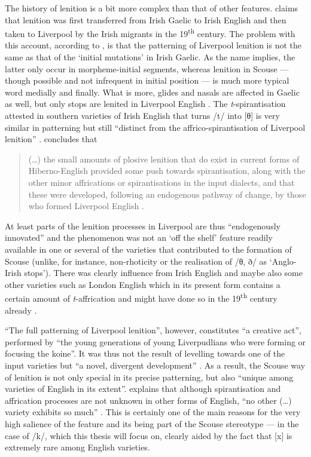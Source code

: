 The history of lenition is a bit more complex than that of other features.
\textcite{hickey1996} claims that lenition was first transferred from Irish Gaelic to Irish English and then taken to Liverpool by the Irish migrants in the 19\textsuperscript{th} century.
The problem with this account, according to \citet{honeybone2007}, is that the patterning of Liverpool lenition is not the same as that of the `initial mutations' in Irish Gaelic.
As the name implies, the latter only occur in morpheme-initial segments, whereas lenition in Scouse --- though possible and not infrequent in initial position --- is much more typical word medially and finally.
What is more, glides and nasals are affected in Gaelic as well, but only stops are lenited in Liverpool English \citep[cf.][131]{honeybone2007}.
The \emph{t}-spirantisation attested in southern varieties of Irish English that turns /t/ into [θ] is very similar in patterning but still ``distinct from the affrico-spirantisation of Liverpool lenition'' \citep[132]{honeybone2007}.
\citeauthor{honeybone2007} concludes that

	\begin{quote}
		(\ldots) the small amounts of plosive lenition that do exist in current forms of Hiberno-English provided some push towards spirantisation, along with the other minor affrications or spirantisations in the input dialects, and that these were developed, following an endogenous pathway of change, by those who formed Liverpool English \citeyearpar[131]{honeybone2007}.
	\end{quote}

At least parts of the lenition processes in Liverpool are thus ``endogenously innovated'' \citep[130]{honeybone2007} and the phenomenon was not an `off the shelf' feature readily available in one or several of the varieties that contributed to the formation of Scouse (unlike, for instance, non-rhoticity or the realisation of /θ, ð/ as `Anglo-Irish stops').
There was clearly influence from Irish English and maybe also some other varieties such as London English which in its present form contains a certain amount of \emph{t}-affrication and might have done so in the 19\textsuperscript{th} century already \citeyearpar[cf.][132]{honeybone2007}.

``The full patterning of Liverpool lenition'', however, constitutes ``a creative act'', performed by ``the young generations of young Liverpudlians who were forming or focusing the koine''.
It was thus not the result of levelling towards one of the input varieties but ``a novel, divergent development'' \citeyearpar[132]{honeybone2007}.
As a result, the Scouse way of lenition is not only special in its precise patterning, but also ``unique among varieties of English in its extent''.
\citeauthor{honeybone2007} explains that although spirantisation and affrication processes are not unknown in other forms of English, ``no other (\ldots) variety exhibits so much'' \citeyearpar[130]{honeybone2007}.
This is certainly one of the main reasons for the very high salience of the feature and its being part of the Scouse stereotype --- in the case of /k/, which this thesis will focus on, clearly aided by the fact that [x] is extremely rare among English varieties.

